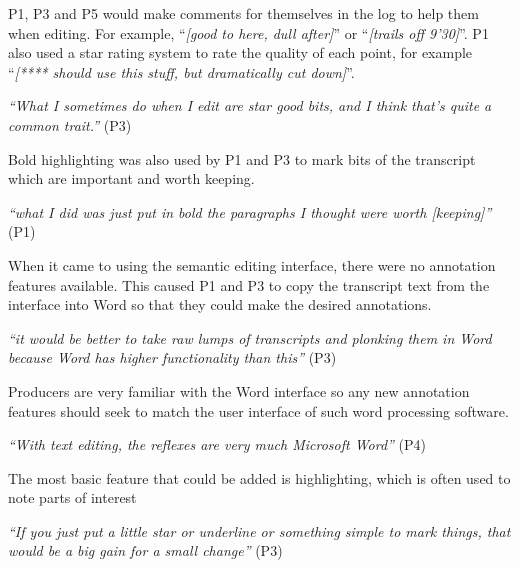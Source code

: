P1, P3 and P5 would make comments for themselves in the log to help them when
editing. For example, ``\textit{[good to here, dull after]}'' or
``\textit{[trails off 9'30]}''. P1 also used a star rating system to rate the
quality of each point, for example ``\textit{[**** should use this stuff, but
  dramatically cut down]}''.

\textit{``What I sometimes do when I edit are star good bits, and I think
  that's quite a common trait.''} (P3)

Bold highlighting was also used by P1 and P3 to mark bits of the transcript
which are important and worth keeping.

\textit{``what I did was just put in bold the paragraphs I thought were worth
  [keeping]''} (P1)

When it came to using the semantic editing interface, there were no annotation
features available. This caused P1 and P3 to copy the transcript text from the
interface into Word so that they could make the desired annotations.

\textit{``it would be better to take raw lumps of transcripts and plonking them
  in Word because Word has higher functionality than this''} (P3)

Producers are very familiar with the Word interface so any new annotation
features should seek to match the user interface of such word processing
software.

\textit{``With text editing, the reflexes are very much Microsoft Word''} (P4)

The most basic feature that could be added is highlighting, which is often used
to note parts of interest

\textit{``If you just put a little star or underline or something simple to
  mark things, that would be a big gain for a small change''} (P3)




